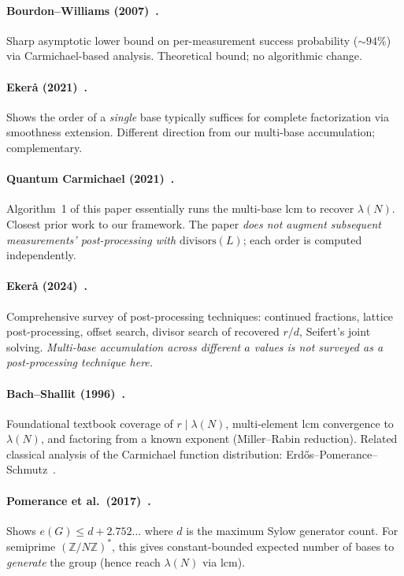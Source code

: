 \documentclass[11pt]{article}
\begin{document}
\paragraph{Bourdon--Williams (2007)~\cite{bourdonwilliams2007}.}
Sharp asymptotic lower bound on per-measurement success probability ($\sim 94\%$) via Carmichael-based analysis. Theoretical bound; no algorithmic change.

\paragraph{Ekerå (2021)~\cite{ekera2021}.}
Shows the order of a \emph{single} base typically suffices for complete factorization via smoothness extension. Different direction from our multi-base accumulation; complementary.

\paragraph{Quantum Carmichael (2021)~\cite{carmichaelquantum2021}.}
Algorithm~1 of this paper essentially runs the multi-base lcm to recover $\lambda(N)$. Closest prior work to our framework. The paper \emph{does not augment subsequent measurements' post-processing with $\mathrm{divisors}(L)$}; each order is computed independently.

\paragraph{Ekerå (2024)~\cite{ekera2024}.}
Comprehensive survey of post-processing techniques: continued fractions, lattice post-processing, offset search, divisor search of recovered $r/d$, Seifert's joint solving. \emph{Multi-base accumulation across different $a$ values is not surveyed as a post-processing technique here.}

\paragraph{Bach--Shallit (1996)~\cite{bachshallit1996}.}
Foundational textbook coverage of $r \mid \lambda(N)$, multi-element lcm convergence to $\lambda(N)$, and factoring from a known exponent (Miller--Rabin reduction). Related classical analysis of the Carmichael function distribution: Erd\H{o}s--Pomerance--Schmutz~\cite{erdosps1991}.

\paragraph{Pomerance et al.\ (2017)~\cite{pomerance2017}.}
Shows $e(G) \leq d + 2.752\ldots$ where $d$ is the maximum Sylow generator count. For semiprime $(\mathbb{Z}/N\mathbb{Z})^*$, this gives constant-bounded expected number of bases to \emph{generate} the group (hence reach $\lambda(N)$ via lcm).
\end{document}
